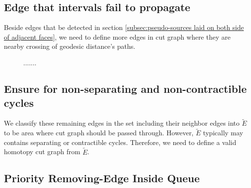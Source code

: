 \documentclass[a4paper,twoside]{article}
\begin{document}
\subsection{Edge that intervals fail to propagate}
Beside edges that be detected in section \ref{subsec:pseudo-sources laid on both side of adjacent faces},  we need to define more edges in cut graph where they are nearby crossing of geodesic distance's paths. 

\begin{figure}[h!]
	\centering		
	\hspace{10pt}

	\caption[]{.......}
	\label{fig:fig-torus_edges_detected}
\end{figure}

\subsection{Ensure for non-separating and non-contractible cycles}


We classify these remaining edges in the set including their neighbor edges into $\tilde{E}$ to be area where cut graph should be passed through. However, $\tilde{E}$ typically may contains separating or contractible cycles. Therefore, we need to define a valid homotopy cut graph from $\tilde{E}$.
\subsection{Priority Removing-Edge Inside Queue }
\end{document}
